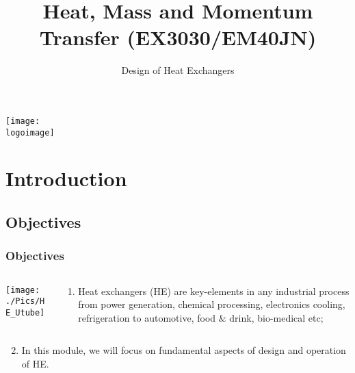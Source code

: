 \documentclass[10pt,compress,unknownkeysallowed]{beamer}
\institute{School of Engineering}
\title{Heat, Mass and Momentum Transfer (EX3030/EM40JN)}
\subtitle{Design of Heat Exchangers}
\date[ ]{ }
\newcommand{\logoimage}{../FigBanner/UoAHorizBanner}
\begin{document}
\begin{frame}
  \titlepage 
  \vfill%
  \begin{center}
    \texttt{[image: \\logoimage]}
  \end{center}
\end{frame}




\section{Introduction} 


\subsection{Objectives}

\begin{frame}
 \frametitle{Objectives}
    \begin{columns}
       \begin{column}[l]{0.6\linewidth}
         \hspace{-.70cm}\texttt{[image: ./Pics/HE\_Utube]}
       \end{column}
       \begin{column}[l]{0.4\linewidth}
          \begin{enumerate}
              \item<1-> Heat exchangers (HE) are key-elements in any industrial process from power generation, chemical processing, electronics cooling, refrigeration to automotive, food $\&$ drink, bio-medical etc;
          \end{enumerate}
       \end{column}      
    \end{columns}
          \begin{enumerate}\setcounter{enumi}{1}
              \item<2-> In this module, we will focus on fundamental aspects of design and operation of HE.
          \end{enumerate}
\end{frame}
\end{document}
